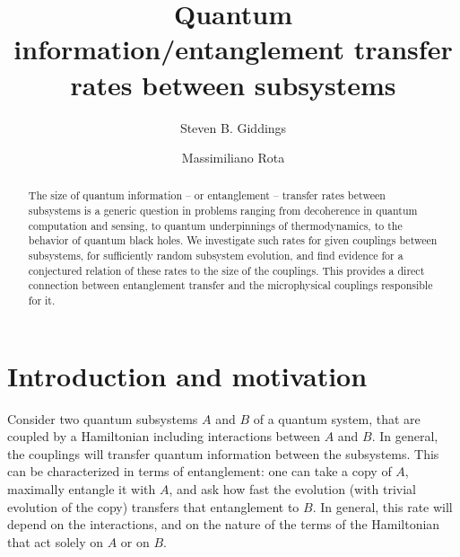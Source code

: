 \documentclass[aps,prd,groupedaddress,nofootinbib,letterpaper]{revtex4}
\begin{document}
\begin{titlepage}


\title{Quantum information/entanglement transfer rates between subsystems}



\author{Steven B. Giddings}

\author{Massimiliano Rota}

\begin{abstract}
The size of quantum information -- or entanglement -- transfer rates between subsystems is a generic question in problems ranging from decoherence in quantum computation  and sensing, to quantum underpinnings of thermodynamics, to the behavior of quantum black holes.  We investigate such rates for given couplings between subsystems, for sufficiently random subsystem evolution, and find evidence for a conjectured relation of these rates to the size of the couplings.  This provides a direct  connection between entanglement transfer and the microphysical couplings responsible for it.



\end{abstract}

\maketitle

\end{titlepage}


\section{Introduction and motivation}

Consider two quantum subsystems $A$ and $B$ of a quantum system, that are coupled by a Hamiltonian including interactions between $A$ and $B$.  In general, the couplings will transfer quantum information between the subsystems.  This can be characterized in terms of entanglement:  one can take a copy of $A$, maximally entangle it with $A$, and ask how fast the evolution (with trivial evolution of the copy) transfers that entanglement to $B$.  In general, this rate will depend on the interactions, and on the nature of the terms of the Hamiltonian that act solely on $A$ or on $B$.  
\end{document}
